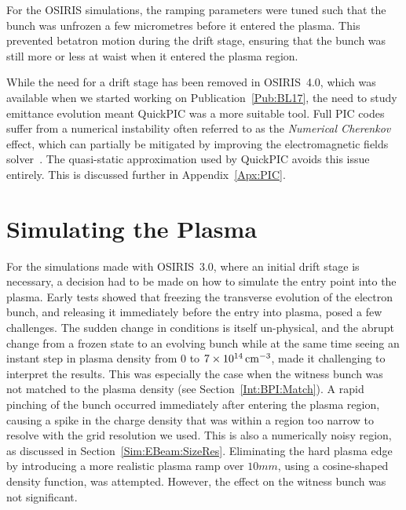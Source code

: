 For the OSIRIS simulations, the ramping parameters were tuned such that the bunch was unfrozen a few micrometres before it entered the plasma.
This prevented betatron motion during the drift stage, ensuring that the bunch was still more or less at waist when it entered the plasma region.

While the need for a drift stage has been removed in OSIRIS~4.0, which was available when we started working on Publication~\ref{Pub:BL17}, the need to study emittance evolution meant QuickPIC was a more suitable tool.
Full PIC codes suffer from a numerical instability often referred to as the \textit{Numerical Cherenkov} effect, which can partially be mitigated by improving the electromagnetic fields solver~\cite{lehe:2013}.
The quasi-static approximation used by QuickPIC avoids this issue entirely.
This is discussed further in Appendix~\ref{Apx:PIC}.

\section{Simulating the Plasma}
\label{Sim:Plasma}

For the simulations made with OSIRIS~3.0, where an initial drift stage is necessary, a decision had to be made on how to simulate the entry point into the plasma.
Early tests showed that freezing the transverse evolution of the electron bunch, and releasing it immediately before the entry into plasma, posed a few challenges.
The sudden change in conditions is itself un-physical, and the abrupt change from a frozen state to an evolving bunch while at the same time seeing an instant step in plasma density from $0$ to $7\times 10^{14}\,\mathrm{cm}^{-3}$, made it challenging to interpret the results.
This was especially the case when the witness bunch was not matched to the plasma density (see Section~\ref{Int:BPI:Match}).
A rapid pinching of the bunch occurred immediately after entering the plasma region, causing a spike in the charge density that was within a region too narrow to resolve with the grid resolution we used.
This is also a numerically noisy region, as discussed in Section~\ref{Sim:EBeam:SizeRes}.
Eliminating the hard plasma edge by introducing a more realistic plasma ramp over $10\unit{mm}$, using a cosine-shaped density function, was attempted.
However, the effect on the witness bunch was not significant.
